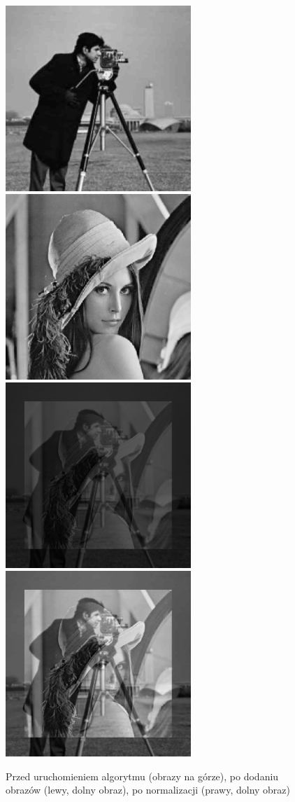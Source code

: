 \documentclass[a4paper,12pt]{book}
\begin{document}
\begin{figure}[H]
	\caption{Przed uruchomieniem algorytmu (obrazy na górze), po dodaniu obrazów (lewy, dolny obraz), po normalizacji (prawy, dolny obraz)}
	\includegraphics[width=7cm, height=7cm]{man-unmodified.jpg}
	\includegraphics[width=7cm, height=7cm]{lena-unmodified.png}
	\includegraphics[width=7cm, height=7cm]{2/sum-gray-images.png}
	\includegraphics[width=7cm, height=7cm]{2/sum-gray-images-norm.png}
\end{figure}
\end{document}
